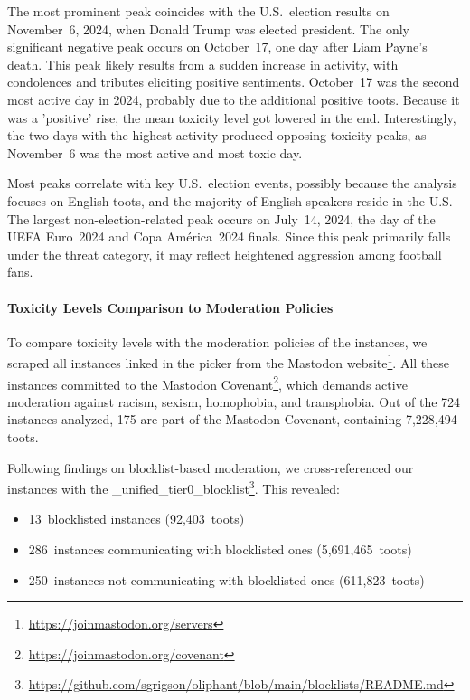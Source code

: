 The most prominent peak coincides with the U.S.\ election results on November~6, 2024, when Donald Trump was elected president. The only significant negative peak occurs on October~17, one day after Liam Payne's death. This peak likely results from a sudden increase in activity, with condolences and tributes eliciting positive sentiments. October~17 was the second most active day in 2024, probably due to the additional positive toots. Because it was a 'positive' rise, the mean toxicity level got lowered in the end. Interestingly, the two days with the highest activity produced opposing toxicity peaks, as November~6 was the most active and most toxic day. 

Most peaks correlate with key U.S.\ election events, possibly because the analysis focuses on English toots, and the majority of English speakers reside in the U.S. The largest non-election-related peak occurs on July~14, 2024, the day of the UEFA Euro~2024 and Copa América~2024 finals. Since this peak primarily falls under the threat category, it may reflect heightened aggression among football fans.

\paragraph{Toxicity Levels Comparison to Moderation Policies}
To compare toxicity levels with the moderation policies of the instances, we scraped all instances linked in the picker from the Mastodon website\footnote{\url{https://joinmastodon.org/servers}}. All these instances committed to the Mastodon Covenant\footnote{\url{https://joinmastodon.org/covenant}}, which demands active moderation against racism, sexism, homophobia, and transphobia. Out of the 724 instances analyzed, 175 are part of the Mastodon Covenant, containing 7,228,494 toots.

Following \citet{bono:2024} findings on blocklist-based moderation, we cross-referenced our instances with the \_unified\_tier0\_blocklist\footnote{\url{https://github.com/sgrigson/oliphant/blob/main/blocklists/README.md}}. This revealed:

\begin{itemize}
    \item 13~blocklisted instances (92,403~toots)
    \item 286~instances communicating with blocklisted ones (5,691,465~toots)
    \item 250~instances not communicating with blocklisted ones (611,823~toots)
\end{itemize}

